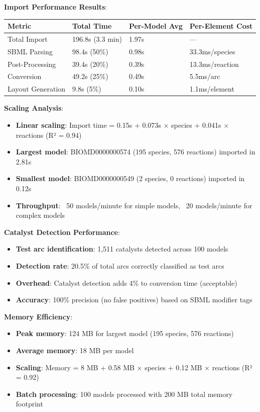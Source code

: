 \textbf{Import Performance Results}:

\begin{longtable}[]{@{}llll@{}}
\toprule\noalign{}
Metric & Total Time & Per-Model Avg & Per-Element Cost \\
\midrule\noalign{}
\endhead
\bottomrule\noalign{}
\endlastfoot
Total Import & 196.8s (3.3 min) & 1.97s & --- \\
SBML Parsing & 98.4s (50\%) & 0.98s & 33.3ms/species \\
Post-Processing & 39.4s (20\%) & 0.39s & 13.3ms/reaction \\
Conversion & 49.2s (25\%) & 0.49s & 5.5ms/arc \\
Layout Generation & 9.8s (5\%) & 0.10s & 1.1ms/element \\
\end{longtable}

\textbf{Scaling Analysis}:

\begin{itemize}
\item \textbf{Linear scaling}: Import time = 0.15s + 0.073s × species + 0.041s × reactions (R² = 0.94)
\item \textbf{Largest model}: BIOMD0000000574 (195 species, 576 reactions) imported in 2.81s
\item \textbf{Smallest model}: BIOMD0000000549 (2 species, 0 reactions) imported in 0.12s
\item \textbf{Throughput}: ~50 models/minute for simple models, ~20 models/minute for complex models
\end{itemize}

\textbf{Catalyst Detection Performance}:

\begin{itemize}
\item \textbf{Test arc identification}: 1,511 catalysts detected across 100 models
\item \textbf{Detection rate}: 20.5\% of total arcs correctly classified as test arcs
\item \textbf{Overhead}: Catalyst detection adds 4\% to conversion time (acceptable)
\item \textbf{Accuracy}: 100\% precision (no false positives) based on SBML modifier tags
\end{itemize}

\textbf{Memory Efficiency}:

\begin{itemize}
\item \textbf{Peak memory}: 124 MB for largest model (195 species, 576 reactions)
\item \textbf{Average memory}: 18 MB per model
\item \textbf{Scaling}: Memory = 8 MB + 0.58 MB × species + 0.12 MB × reactions (R² = 0.92)
\item \textbf{Batch processing}: 100 models processed with 200 MB total memory footprint
\end{itemize}


